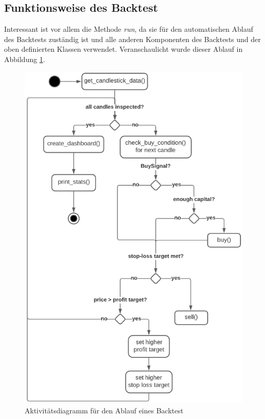 \documentclass[oneside]{ausarbeitung}
\begin{document}
\subsection{Funktionsweise des Backtest}
\label{sub:funktionsweise_des_backtest}

Interessant ist vor allem die Methode \textit{run}, da sie für den automatischen Ablauf des Backtests zuständig ist und alle anderen Komponenten des Backtests und der oben definierten Klassen verwendet. Veranschaulicht wurde dieser Ablauf in Abbildung \ref{fig:13}.

\begin{figure}[H]
  \centering
  \includegraphics[height=1\textheight]{uml/backtest_activity_uml.png}
  \caption{Aktivitätsdiagramm für den Ablauf eines Backtest}
  \label{fig:13}
\end{figure}
\end{document}
